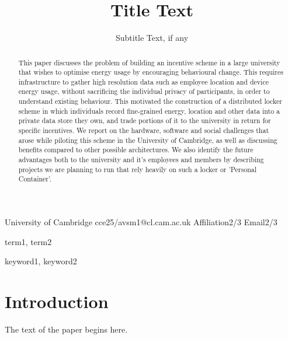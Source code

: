 \documentclass[10pt,twocolumn]{sigplanconf}
\begin{document}
\copyrightdata{[to be supplied]} 


\title{Title Text}
\subtitle{Subtitle Text, if any}

           {University of Cambridge}
           {cce25/avsm1@cl.cam.ac.uk}
           {Affiliation2/3}
           {Email2/3}

\maketitle

\begin{abstract}
This paper discusses the problem of building an incentive scheme in a large university that wishes to optimise energy usage by encouraging behavioural change. This requires infrastructure to gather high resolution data such as employee location and device energy usage, without sacrificing the individual privacy of participants, in order to understand existing behaviour. This motivated the construction of a distributed locker scheme in which individuals record fine-grained energy, location and other data into a private data store they own, and trade portions of it to the university in return for specific incentives. We report on the hardware, software and social challenges that arose while piloting this scheme in the University of Cambridge, as well as discussing benefits compared to other possible architectures. We also identify the future advantages both to the university and it's employees and members by describing projects we are planning to run that rely heavily on such a locker or 'Personal Container'.\end{abstract}


\terms
term1, term2

\keywords
keyword1, keyword2

\section{Introduction}

The text of the paper begins here.

\appendix
\end{document}
